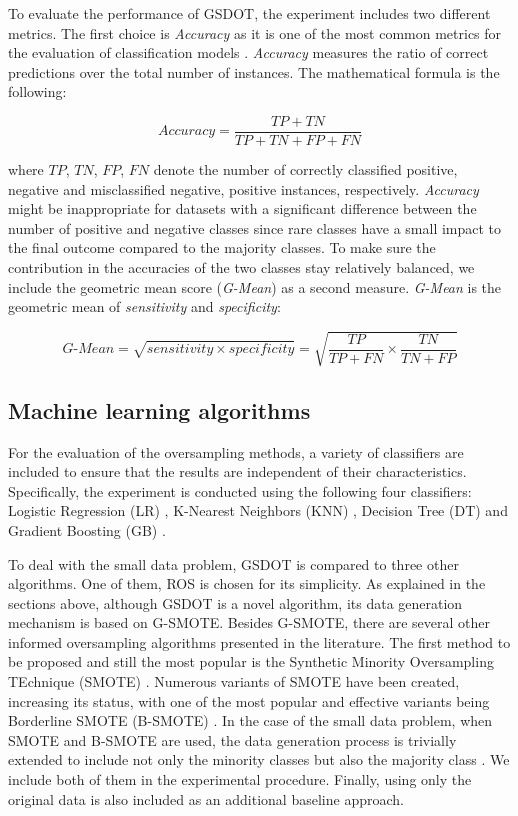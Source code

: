 To evaluate the performance of GSDOT, the experiment includes two different metrics. The first choice is \textit{Accuracy} as it is one of the most common metrics for the evaluation of classification models \cite{M.2015}. \textit{Accuracy} measures the ratio of correct predictions over the total number of instances. The mathematical formula is the following:

$$ \textit{Accuracy} = \frac{TP + TN}{TP +TN + FP + FN}$$

where \( TP \), \( TN \), \(FP \), \( FN\) denote the number of correctly classified positive, negative and misclassified negative, positive instances, respectively. \textit{Accuracy} might be inappropriate for datasets with a significant difference between the number of positive and negative classes since rare classes have a small impact to the final outcome compared to the majority classes. To make sure the contribution in the accuracies of the two classes stay relatively balanced, we include the geometric mean score (\textit{G-Mean}) as a second measure. \textit{G-Mean} is the geometric mean of \textit{sensitivity} and \textit{specificity}:

$$\textit{G-Mean} = \sqrt{sensitivity \times specificity} = \sqrt{\frac{TP}{TP + FN} \times \frac{TN}{TN + FP}}$$

\subsection{Machine learning algorithms}

For the evaluation of the oversampling methods, a variety of classifiers are included to ensure that the results are independent of their characteristics. Specifically, the experiment is conducted using the following four classifiers: Logistic Regression (LR) \cite{McCullagh.2019}, K-Nearest Neighbors (KNN) \cite{Cover.1967}, Decision Tree (DT) \cite{Salzberg.1994} and Gradient Boosting (GB) \cite{Friedman.2001}.

To deal with the small data problem, GSDOT is compared to three other algorithms. One of them, ROS is chosen for its simplicity. As explained in the sections above, although GSDOT is a novel algorithm, its data generation mechanism is based on G-SMOTE. Besides G-SMOTE, there are several other informed oversampling algorithms presented in the literature. The first method to be proposed and still the most popular is the Synthetic Minority Oversampling TEchnique (SMOTE) \cite{Chawla.2002}. Numerous variants of SMOTE have been created, increasing its status\cite{Fernandez.2018}, with one of the most popular and effective variants being Borderline SMOTE (B-SMOTE) \cite{Han.2005}. In the case of the small data problem, when SMOTE and B-SMOTE are used, the data generation process is trivially extended to include not only the minority classes but also the majority class \cite{Li.2018}. We include both of them in the experimental procedure. Finally, using only the original data is also included as an additional baseline approach.

